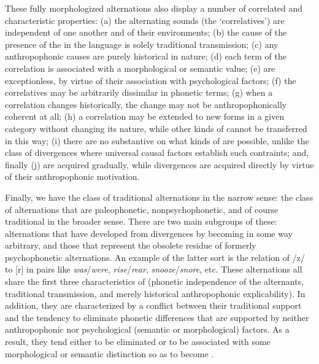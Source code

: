 These fully morphologized alternations also display a number of
correlated and characteristic properties: (a) the alternating sounds
(the `correlatives') are independent of one another and of their
environments; (b) the cause of the presence of the  in the
language is solely traditional transmission; (c) any anthropophonic
causes are purely historical in nature; (d) each term of the
correlation is associated with a morphological or semantic value; (e)
 are exceptionless, by virtue of their association with
psychological factors; (f) the correlatives may be arbitrarily
dissimilar in phonetic terms; (g) when a correlation changes
historically, the change may not be anthropophonically coherent at
all; (h) a correlation may be extended to new forms in a given
category without changing its nature, while other kinds of 
cannot be transferred in this way; (i) there are no substantive
 on what kinds of  are possible, unlike the
class of divergences where universal causal factors establish such
contraints; and, finally (j)  are acquired gradually,
while divergences are acquired directly by virtue of their
anthropophonic motivation.

Finally, we have the class of traditional alternations in the narrow
sense: the class of alternations that are paleophonetic,
nonpsychophonetic, and of course traditional in the broader
sense. There are two main subgroups of these: alternations that have
developed from divergences by becoming in some way arbitrary, and
those that represent the obsolete residue of formerly psychophonetic
alternations. An example of the latter sort is the relation of /z/ to
[r] in  pairs like \emph{was}/\emph{were},
\emph{rise}/\emph{rear}, \emph{snooze}/\emph{snore}, etc. These
alternations all share the first three characteristics of 
(phonetic independence of the alternants, traditional transmission,
and merely historical anthropophonic explicability). In addition, they
are characterized by a conflict between their traditional support and
the tendency to eliminate phonetic differences that are supported by
neither anthropophonic nor psychological (semantic or morphological)
factors. As a result, they tend either to be eliminated or to be
associated with some morphological or semantic distinction so as to
become .

